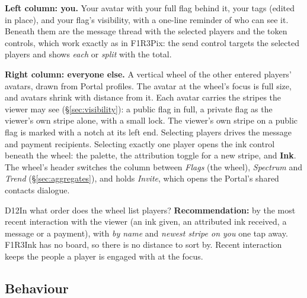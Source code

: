 \documentclass[11pt,a4paper]{article}
\begin{document}
\textbf{Left column: you.} Your avatar with your full flag behind it, your tags (edited in
place), and your flag's visibility, with a one-line reminder of who can see it. Beneath them are
the message thread with the selected players and the token controls, which work exactly as in
F1R3Pix: the send control targets the selected players and shows \emph{each} or \emph{split}
with the total.

\textbf{Right column: everyone else.} A vertical wheel of the other entered players' avatars,
drawn from Portal profiles. The avatar at the wheel's focus is full size, and avatars shrink
with distance from it. Each avatar carries the stripes the viewer may see (\S\ref{sec:visibility}):
a public flag in full, a private flag as the viewer's own stripe alone, with a small lock. The
viewer's own stripe on a public flag is marked with a notch at its left end. Selecting players
drives the message and payment recipients. Selecting exactly one player opens the ink control
beneath the wheel: the palette, the attribution toggle for a new stripe, and \textbf{Ink}. The
wheel's header switches the column between \emph{Flags} (the wheel), \emph{Spectrum} and
\emph{Trend} (\S\ref{sec:aggregates}), and holds \emph{Invite}, which opens the Portal's shared
contacts dialogue.

\begin{decision}{D12}{In what order does the wheel list players?}
\textbf{Recommendation:} by the most recent interaction with the viewer (an ink given, an
attributed ink received, a message or a payment), with \emph{by name} and \emph{newest stripe on
you} one tap away. F1R3Ink has no board, so there is no distance to sort by. Recent interaction
keeps the people a player is engaged with at the focus.
\end{decision}

\subsection{Behaviour}
\end{document}
